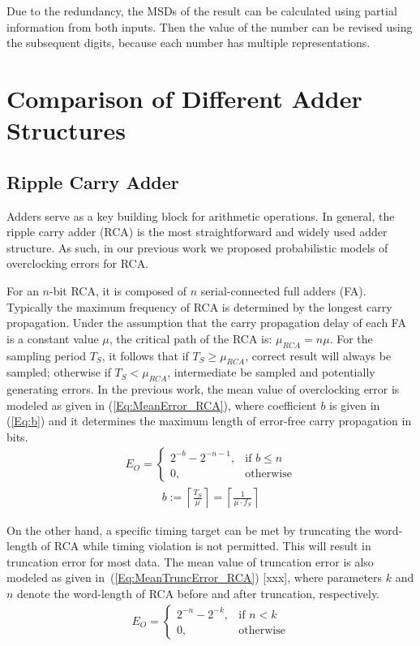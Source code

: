 \documentclass[10pt, conference, compsocconf]{IEEEtran}
\begin{document}
Due to the redundancy, the MSDs of the result can be calculated using partial information from both inputs. Then the value of the number can be revised using the subsequent digits, because each number has multiple representations.

\section{Comparison of Different Adder Structures}
\subsection{Ripple Carry Adder}
Adders serve as a key building block for arithmetic operations. In general, the ripple carry adder (RCA) is the most straightforward and widely used adder structure. As such, in our previous work we proposed probabilistic models of overclocking errors for RCA.

For an $n$-bit RCA, it is composed of $n$ serial-connected full adders (FA). Typically the maximum frequency of RCA is determined by the longest carry propagation. Under the assumption that the carry propagation delay of each FA is a constant value $\mu$, the critical path of the RCA is: $\mu_{RCA}=n\mu$. For the sampling period $T_S$, it follows that if $T_S\geqslant\mu_{RCA}$, correct result will always be sampled; otherwise if $T_S<\mu_{RCA}$, intermediate be sampled and potentially generating errors. In the previous work, the mean value of overclocking error is modeled as given in (\ref{Eq:MeanError_RCA}), where coefficient $b$ is given in (\ref{Eq:b}) and it determines the maximum length of error-free carry propagation in bits.
%
\begin{eqnarray}\label{Eq:MeanError_RCA}
    E_O=\left\{
        \begin{matrix}
            2^{-b}-2^{-n-1}, & \textrm{if $b\leq n$}\\
            0, & \textrm{otherwise}
        \end{matrix}
        \right.
\end{eqnarray}
%
\begin{eqnarray}\label{Eq:b}
    b:=\left\lceil \frac{T_S}{\mu} \right\rceil=\left\lceil \frac{1}{\mu\cdot f_S}\right\rceil
\end{eqnarray}

On the other hand, a specific timing target can be met by truncating the word-length of RCA while timing violation is not permitted. This will result in truncation error for most data.  The mean value of truncation error is also modeled as given in~(\ref{Eq:MeanTruncError_RCA}) [xxx], where parameters $k$ and $n$ denote the word-length of RCA before and after truncation, respectively. 
%
\begin{eqnarray}\label{Eq:MeanTruncError_RCA}
    E_O=\left\{
        \begin{matrix}
            2^{-n}-2^{-k}, & \textrm{if $n<k$}\\
            0, & \textrm{otherwise}
        \end{matrix}
        \right.
\end{eqnarray}
\end{document}
